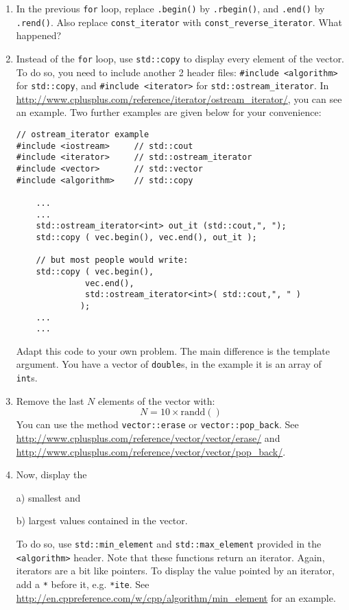 \begin{enumerate}

\item In the previous \verb+for+ loop, replace \verb+.begin()+ by \verb+.rbegin()+, and \verb+.end()+ by \verb+.rend()+. Also replace \verb+const_iterator+ with \verb+const_reverse_iterator+. What happened?

\item Instead of the \verb+for+ loop, use \verb+std::copy+ to display every element of the vector. To do so, you need to include another 2 header files:
\verb+#include <algorithm>+ for \verb+std::copy+, and \verb+#include <iterator>+ for \verb+std::ostream_iterator+. 
In \url{http://www.cplusplus.com/reference/iterator/ostream_iterator/}, you can see an example. 
Two further examples are given below for your convenience:
\begin{lstlisting}
// ostream_iterator example
#include <iostream>     // std::cout
#include <iterator>     // std::ostream_iterator
#include <vector>       // std::vector
#include <algorithm>    // std::copy

    ...
    ...
    std::ostream_iterator<int> out_it (std::cout,", ");
    std::copy ( vec.begin(), vec.end(), out_it );
  
    // but most people would write:
    std::copy ( vec.begin(), 
              vec.end(), 
              std::ostream_iterator<int>( std::cout,", " )
             );
    ...
    ...
\end{lstlisting}
Adapt this code to your own problem. The main difference is the template argument. 
You have a vector of \verb+double+s, in the example it is an array of \verb+int+s.

\item Remove the last $N$ elements of the vector with:
$$
	N = 10 \times \mathrm{randd()}
$$
You can use the method \verb+vector::erase+ or \verb+vector::pop_back+. 
See \url{http://www.cplusplus.com/reference/vector/vector/erase/} and \url{http://www.cplusplus.com/reference/vector/vector/pop_back/}.

\item Now, display the 

a) smallest and 

b) largest values contained in the vector. 

To do so, use \verb+std::min_element+ and \verb+std::max_element+ provided in the \verb+<algorithm>+ header. Note that these functions return an iterator. Again, iterators are a bit like pointers. To display the value pointed by an iterator, add a \verb+*+ before it, e.g. \verb+*ite+.
See \url{http://en.cppreference.com/w/cpp/algorithm/min_element} for an example.


\end{enumerate}
